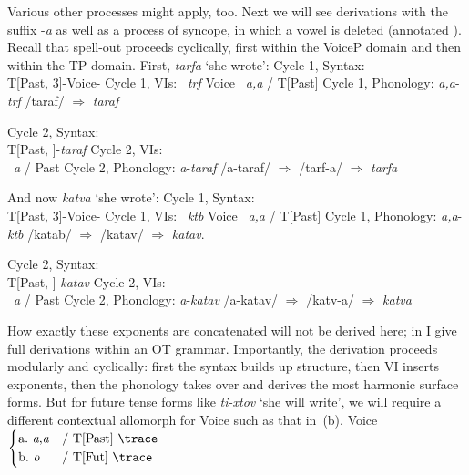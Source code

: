 {Various other processes might apply, too. Next we will see derivations with the  suffix -\emph{a} as well as a process of syncope, in which a vowel is deleted (annotated ). Recall that spell-out proceeds cyclically, first within the VoiceP domain and then within the TP domain. First, \emph{tarfa} `she wrote':
\ex Cycle 1, Syntax:\\
	 T[Past, 3]-Voice-
\xe
\pex Cycle 1, VIs:
	\a {} \lra~\emph{trf}
	\a Voice \lra~\emph{a,a} / T[Past] \trace
\xe
\pex Cycle 1, Phonology:
	\a \emph{a,a}-\emph{trf}
	\a /taraf/ $\Rightarrow$ \emph{taraf}
\xe

\ex Cycle 2, Syntax:\\
	T[Past, ]-\emph{taraf}
\xe
\ex Cycle 2, VIs:\\
	 \lra~\emph{a} / Past \trace
\xe
\pex Cycle 2, Phonology:
	\a \emph{a}-\emph{taraf}
	\a /a-taraf/ $\Rightarrow$ /tarf-a/ $\Rightarrow$ \emph{tarfa}
\xe

And now \emph{katva} `she wrote':
\ex Cycle 1, Syntax:\\
	T[Past, 3]-Voice-
\xe
\pex Cycle 1, VIs:
	\a {} \lra~\emph{ktb}
	\a Voice \lra~\emph{a,a} / T[Past] \trace
\xe
\pex Cycle 1, Phonology:
	\a \emph{a,a}-\emph{ktb}
	\a	/katab/ $\Rightarrow$ /katav/ $\Rightarrow$ \emph{katav}.
\xe

\ex Cycle 2, Syntax:\\
	T[Past, ]-\emph{katav}
\xe
\ex Cycle 2, VIs:\\
	 \lra~\emph{a} / Past \trace
\xe
\pex Cycle 2, Phonology:
	\a \emph{a}-\emph{katav}
	\a /a-katav/ $\Rightarrow$ /katv-a/ $\Rightarrow$ \emph{katva}
\xe

How exactly these exponents are concatenated will not be derived here; in \cite{kastner18nllt} I give full derivations within an OT grammar. Importantly, the derivation proceeds modularly and cyclically: first the syntax builds up structure, then VI inserts exponents, then the phonology takes over and derives the most harmonic surface forms. But for future tense forms like \emph{ti-xtov} `she will write', we will require a different contextual allomorph for Voice such as that in~(\nextx b).
\ex \label{vi:voice} Voice \lra $\begin{cases}
		\text{a.~\emph{a},\emph{a}} & \text{/ T[Past] \trace}\\
		\text{b.~\emph{o}} & \text{/ T[Fut] \trace}\\
		\end{cases}$
\xe

}
